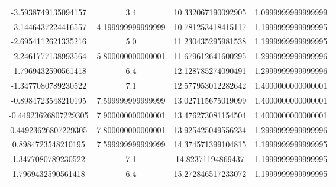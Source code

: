 \begin{table}
\begin{tabular}{S[]S[]S[]S[]}
-3.5938749135094157 & 3.4                 & 10.332067190092905 & 1.0999999999999999\\ 
-3.1446437224416557 & 4.199999999999999   & 10.781253418415117 & 1.1999999999999995\\
-2.6954112621335216 & 5.0                 & 11.230435295981538 & 1.1999999999999995\\
-2.2461777138993564 & 5.800000000000001   & 11.679612641600295 & 1.2999999999999996\\
-1.7969432590561418 & 6.4                 & 12.128785274090491 & 1.2999999999999996\\
-1.3477080789230522 & 7.1                 & 12.577953012282642 & 1.4000000000000001\\
-0.8984723548210195 & 7.599999999999999   & 13.027115675019099 & 1.4000000000000001\\
-0.44923626807229305 & 7.900000000000001  & 13.476273081154504 & 1.4000000000000001\\
0.44923626807229305 & 7.800000000000001   & 13.925425049556234 & 1.2999999999999996\\
0.8984723548210195 & 7.599999999999999    & 14.374571399104815 & 1.1999999999999995\\
1.3477080789230522 & 7.1                  & 14.82371194869437 & 1.1999999999999995\\
1.7969432590561418 & 6.4                  & 15.272846517233072 & 1.1999999999999995\\

\bottomrule
\end{tabular}\end{table}
